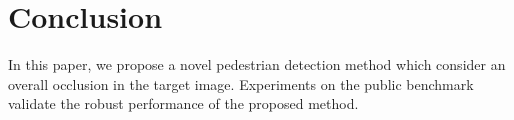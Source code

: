 \documentclass[runningheads]{llncs}
\begin{document}




\section{Conclusion}
\label{sec:conclusion}
In this paper, we propose a novel pedestrian detection method which consider an overall occlusion in the target image.
Experiments on the public benchmark validate the robust performance of the proposed method.







{\small


}
\end{document}
